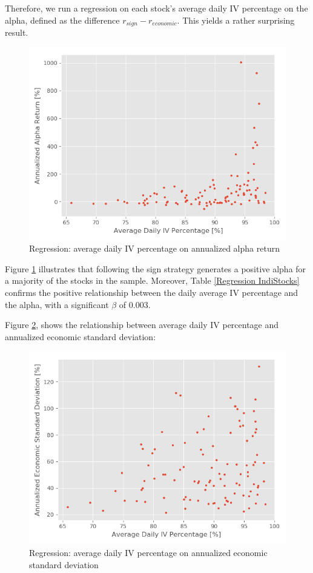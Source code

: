 Therefore, we run a regression on each stock’s average daily IV percentage on the alpha, defined as the difference $r_{sign}-r_{economic}$. This yields a rather surprising result.

\begin{figure}[h]
    \centering
    \includegraphics[scale = 0.5]{Plot/IndividualStockRegression2.png}
    \caption{Regression: average daily IV percentage on annualized alpha return}
    \label{IVAlphaRegression}
\end{figure}

\newpage

Figure \ref{IVAlphaRegression} illustrates that following the sign strategy generates a positive alpha for a majority of the stocks in the sample. Moreover, Table \ref{Regression IndiStocks} confirms the positive relationship between the daily average IV percentage and the alpha, with a significant $\beta$ of $0.003$. 

Figure \ref{IVtoVol}, shows the relationship between average daily IV percentage and annualized economic standard deviation:

\begin{figure}[h]
    \centering
    \includegraphics[scale = 0.5]{Plot/IVvsEconomicVolatilityRegression.png}
    \caption{Regression: average daily IV percentage on annualized economic standard deviation}
    \label{IVtoVol}
\end{figure}

